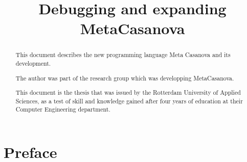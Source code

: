 


\title{Debugging and expanding MetaCasanova}
\author{\writer}

\begin{titlepage}
   
\end{titlepage}


   \begin{abstract}
      This document describes the new programming language Meta Casanova and its development.

The author was part of the research group which was developping MetaCasanova.

This document is the thesis that was issued by the Rotterdam University of Applied Sciences, as a test of skill and knowledge gained after four years of education at their Computer Engineering department.
   \end{abstract}
   \newpage


   \setcounter{tocdepth}{1}
   \tableofcontents
   \cleardoublepage
   \addtocounter{page}{4}


\part{Preface}
% 
   

